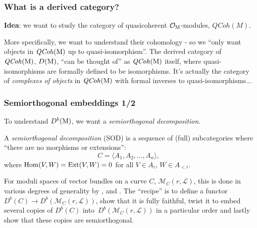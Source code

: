 \documentclass{beamer}
\begin{document}
\begin{frame}
    \frametitle{What is a derived category?}
\textbf{Idea}: we want to study the category of
quasicoherent $\mathcal{O}_{\operatorname{M}}$-modules, $\mathit{QCoh}(M)$.

More specifically, we want to understand their cohomology -
so we ``only want objects in $\mathit{QCoh}(\operatorname{M})$ up to quasi-isomorphism''. \pause
\vfill
The derived category of $\mathit{QCoh}(\operatorname{M})$, $D(\operatorname{M})$,
``can be thought of'' as $\mathit{QCoh}(\operatorname{M})$ itself, where quasi-isomorphisms are
formally defined to be isomorphisms. \pause
\vfill
\small{It's actually the category of \emph{complexes of objects} in $\mathit{QCoh}(\operatorname{M})$
with formal inverses to quasi-isomorphisms...}

\end{frame}
\begin{frame}
    \frametitle{Semiorthogonal embeddings 1/2}
To understand $D^b(\operatorname{M})$, we want a \emph{semiorthogonal decomposition}.

\begin{definition}
A \emph{semiorthogonal decomposition} (SOD) is a sequence of (full) subcategories
where ``there are no morphisms or extensions'':
\[
   \mathit{C} = \langle A_1, A_2, \dots, A_n \rangle,
\]
where $\operatorname{Hom}(V, W) = \operatorname{Ext}(V, W) = 0$ for all $V \in A_i$, $W \in A_{< i}$.
\end{definition}\pause

For moduli spaces of vector bundles on a curve $C$,
$\mathcal{M}_{C}(r, \mathcal{L})$, this is done in various degrees of generality by
\cite{MR3713871, MR3880395, MR3764066}, \cite{MR3954042} and \cite{MR4651618}.
The ``recipe'' is to define a functor $D^b(C) \to D^b(\mathcal{M}_C(r, \mathcal{L}))$,
show that it is fully faithful, twist it to embed several copies of $D^b(C)$
into~$D^b(\mathcal{M}_{C}(r, \mathcal{L}))$ in a particular order and lastly show
that these copies are semiorthogonal.

\end{frame}
\end{document}
